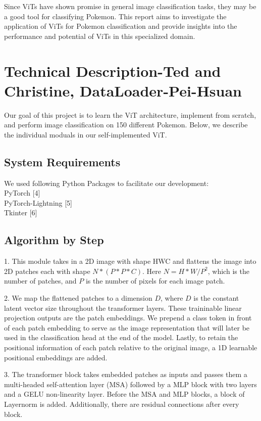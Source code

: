 \documentclass{article} %
\begin{document}
Since ViTs have shown promise in general image classification tasks, they may be a good 
tool for classifying Pokemon. This report aims to investigate the application of ViTs for 
Pokemon classification and provide insights into the performance and potential of ViTs in 
this specialized domain.

\section{Technical Description-Ted and Christine, DataLoader-Pei-Hsuan}
\label{gen_inst}

Our goal of this project is to learn the ViT architecture, implement from scratch, and
perform image classification on 150 different Pokemon. Below, we describe the individual 
moduals in our self-implemented ViT.

\subsection{System Requirements}
We used following Python Packages to facilitate our development: \\
PyTorch [4] \\
PyTorch-Lightning [5] \\
Tkinter [6] \\

\subsection{Algorithm by Step}

1. This module takes in a 2D image with shape HWC and flattens the image into 2D patches each with shape $N * (P * P * C)$.
Here $N = {H * W} / {P^2}$, which is the number of patches, and $P$ is the number of pixels for each image patch.

2. We map the flattened patches to a dimension $D$, where $D$ is the constant latent vector size throughout the transformer layers.
These traininable linear projection outputs are the patch embeddings.
We prepend a class token in front of each patch embedding to serve as the image representation that will later be used in the
classification head at the end of the model. Lastly, to retain the positional information of each patch relative to the original image,
a 1D learnable positional embeddings are added.

3. The transformer block takes embedded patches as inputs and passes them a multi-headed self-attention layer (MSA)
followed by a MLP block with two layers and a GELU non-linearity layer. Before the MSA and MLP blocks, a block of Layernorm is added.
Additionally, there are residual connections after every block.
\end{document}
